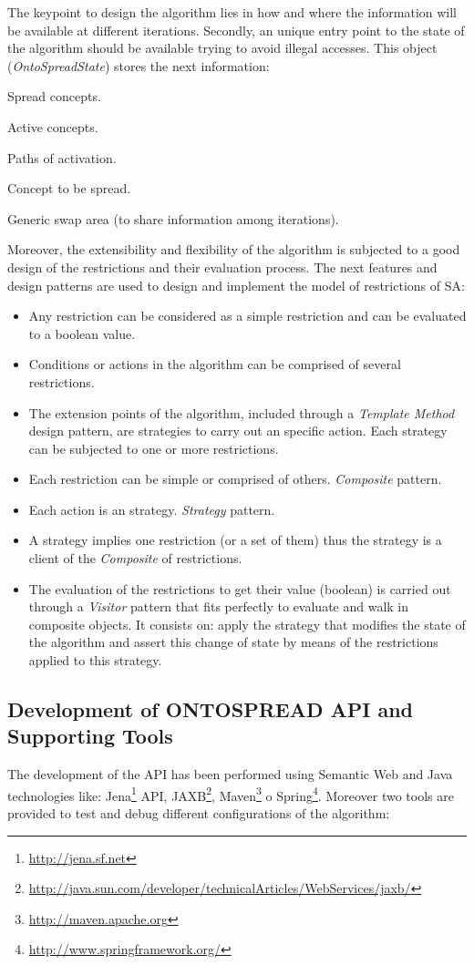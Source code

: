 The keypoint to design the algorithm lies in how and where
the information will be available at different iterations. Secondly, an unique entry point
to the state of the algorithm should be available trying to avoid
illegal accesses. This object (\textit{OntoSpreadState}) stores the next information: \begin{inparaenum}\item Spread
concepts. \item Active concepts. \item Paths of activation. \item Concept to be
spread. \item Generic swap area (to share information among iterations). \end{inparaenum}
Moreover, the extensibility and flexibility of the algorithm is subjected to a good design
of the restrictions and their evaluation process. The next features and design patterns 
are used to design and implement the model of restrictions of SA:
\begin{itemize}
  \item Any restriction can be considered as a simple restriction and can be
evaluated to a boolean value.
  \item Conditions or actions in the algorithm can be comprised of several
restrictions.
  \item The extension points of the algorithm, included through a
\textit{Template Method} design pattern, are strategies to carry out an specific
action. Each strategy can be subjected to one or more restrictions.
\item Each restriction can be simple or comprised of others. \textit{Composite} pattern.
  \item Each action is an strategy. \textit{Strategy} pattern.
  \item A strategy implies one restriction (or a set of them) thus the strategy
is a client of the \textit{Composite} of restrictions.
  \item The evaluation of the restrictions to get their value (boolean) is
carried out through a \textit{Visitor} pattern that fits perfectly to evaluate and walk in
composite objects. It consists on: apply the strategy that modifies the state
of the algorithm and assert this change of state by means of the restrictions applied
to this strategy.
\end{itemize}

\subsection{Development of ONTOSPREAD API and Supporting Tools}
The development of the API has been performed using Semantic Web and Java technologies
like: Jena\footnote{\url{http://jena.sf.net}} API, JAXB\footnote{\url{
http://java.sun.com/developer/technicalArticles/WebServices/jaxb/}}, 
Maven\footnote{\url{http://maven.apache.org}} o
Spring\footnote{\url{http://www.springframework.org/}}. Moreover two tools are provided to test and debug different configurations
of the algorithm:

